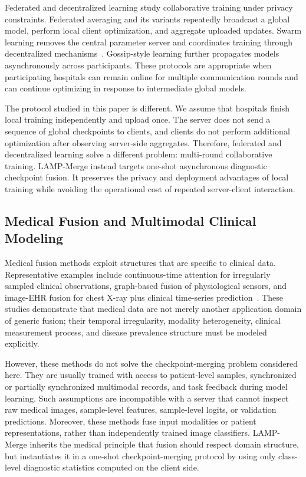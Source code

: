 Federated and decentralized learning study collaborative training under privacy constraints. Federated averaging and its variants repeatedly broadcast a global model, perform local client optimization, and aggregate uploaded updates. Swarm learning removes the central parameter server and coordinates training through decentralized mechanisms~\cite{warnat2021swarm}. Gossip-style learning further propagates models asynchronously across participants. These protocols are appropriate when participating hospitals can remain online for multiple communication rounds and can continue optimizing in response to intermediate global models.

The protocol studied in this paper is different. We assume that hospitals finish local training independently and upload once. The server does not send a sequence of global checkpoints to clients, and clients do not perform additional optimization after observing server-side aggregates. Therefore, federated and decentralized learning solve a different problem: multi-round collaborative training. LAMP-Merge instead targets one-shot asynchronous diagnostic checkpoint fusion. It preserves the privacy and deployment advantages of local training while avoiding the operational cost of repeated server-client interaction.

\subsection{Medical Fusion and Multimodal Clinical Modeling}

Medical fusion methods exploit structures that are specific to clinical data. Representative examples include continuous-time attention for irregularly sampled clinical observations, graph-based fusion of physiological sensors, and image-EHR fusion for chest X-ray plus clinical time-series prediction~\cite{shukla2021mtan,zhang2022raindrop,hayat2022medfuse}. These studies demonstrate that medical data are not merely another application domain of generic fusion; their temporal irregularity, modality heterogeneity, clinical measurement process, and disease prevalence structure must be modeled explicitly.

However, these methods do not solve the checkpoint-merging problem considered here. They are usually trained with access to patient-level samples, synchronized or partially synchronized multimodal records, and task feedback during model learning. Such assumptions are incompatible with a server that cannot inspect raw medical images, sample-level features, sample-level logits, or validation predictions. Moreover, these methods fuse input modalities or patient representations, rather than independently trained image classifiers. LAMP-Merge inherits the medical principle that fusion should respect domain structure, but instantiates it in a one-shot checkpoint-merging protocol by using only class-level diagnostic statistics computed on the client side.

